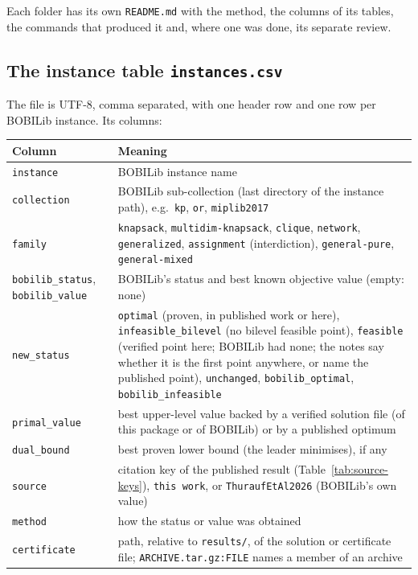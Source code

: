 \noindent Each folder has its own \texttt{README.md} with the method, the
columns of its tables, the commands that produced it and, where one was done,
its separate review.

\subsection{The instance table \texttt{instances.csv}}\label{app:data-csv}

The file is UTF-8, comma separated, with one header row and one row per
BOBILib instance. Its columns:

\begin{center}
\small
\begin{tabular}{@{}p{1.5in}p{4.8in}@{}}
\toprule
Column & Meaning\\
\midrule
\texttt{instance} & BOBILib instance name\\
\texttt{collection} & BOBILib sub-collection (last directory of the instance path), e.g.\ \texttt{kp}, \texttt{or}, \texttt{miplib2017}\\
\texttt{family} & \texttt{knapsack}, \texttt{multidim-knapsack}, \texttt{clique}, \texttt{network}, \texttt{generalized}, \texttt{assignment} (interdiction), \texttt{general-pure}, \texttt{general-mixed}\\
\texttt{bobilib\_status}, \texttt{bobilib\_value} & BOBILib's status and best known objective value (empty: none)\\
\texttt{new\_status} & \texttt{optimal} (proven, in published work or here), \texttt{infeasible\_bilevel} (no bilevel feasible point), \texttt{feasible} (verified point here; BOBILib had none; the notes say whether it is the first point anywhere, or name the published point), \texttt{unchanged}, \texttt{bobilib\_optimal}, \texttt{bobilib\_infeasible}\\
\texttt{primal\_value} & best upper-level value backed by a verified solution file (of this package or of BOBILib) or by a published optimum\\
\texttt{dual\_bound} & best proven lower bound (the leader minimises), if any\\
\texttt{source} & citation key of the published result (Table~\ref{tab:source-keys}), \texttt{this work}, or \texttt{ThuraufEtAl2026} (BOBILib's own value)\\
\texttt{method} & how the status or value was obtained\\
\texttt{certificate} & path, relative to \texttt{results/}, of the solution or certificate file; \texttt{ARCHIVE.tar.gz:FILE} names a member of an archive\\

\end{tabular}
\end{center}
